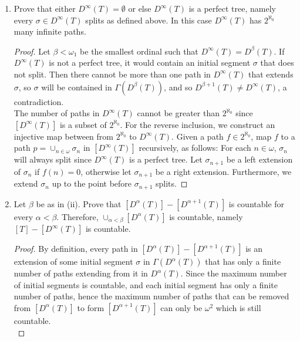 \documentclass{article}
\begin{document}
\begin{enumerate}[label={\bf Q\arabic*:}]
\begin{enumerate}[label={(\roman*)}]
      \item Prove that either $D^\infty(T)=\emptyset$ or else $D^\infty(T)$
        is a perfect tree, namely every $\sigma\in D^\infty(T)$ splits as
        defined above. In this case $D^\infty(T)$ has $2^{\aleph_0}$ many
        infinite paths.

        \begin{proof}
          Let $\beta<\omega_1$ be the smallest ordinal such that
          $D^\infty(T)=D^\beta(T)$. If $D^\infty(T)$ is not a perfect tree,
          it would contain an initial segment $\sigma$ that does not split.
          Then there cannot be more than one path in $D^\infty(T)$ that
          extends $\sigma$, so $\sigma$ will be contained in
          $\Gamma(D^\beta(T))$, and so $D^{\beta+1}(T)\neq
          D^\infty(T)$, a contradiction. \\

          The number of paths in $D^\infty(T)$ cannot be greater than
          $2^{\aleph_0}$ since $[D^\infty(T)]$ is a subset of
          $2^{\aleph_0}$. For the reverse inclusion, we construct an
          injective map between from $2^{\aleph_0}$ to $D^\infty(T)$. Given
          a path $f\in2^{\aleph_0}$, map $f$ to a path
          $p=\cup_{n\in\omega}\sigma_n$ in $[D^\infty(T)]$ recursively, as
          follows: For each $n\in\omega$, $\sigma_n$ will always split
          since $D^\infty(T)$ is a perfect tree. Let $\sigma_{n+1}$ be a
          left extension of $\sigma_{n}$ if $f(n)=0$, otherwise let
          $\sigma_{n+1}$ be a right extension. Furthermore, we extend
          $\sigma_n$ up to the point before $\sigma_{n+1}$ splits.
        \end{proof}

      \item Let $\beta$ be as in (ii). Prove that
        $[D^\alpha(T)]-[D^{\alpha+1}(T)]$ is countable for every
        $\alpha<\beta$. Therefore, $\cup_{\alpha<\beta}[D^\alpha(T)]$ is
        countable, namely $[T]-[D^\infty(T)]$ is countable.

        \begin{proof}
          By definition, every path in $[D^\alpha(T)]-[D^{\alpha+1}(T)]$ is
          an extension of some initial segment $\sigma$ in
          $\Gamma(D^\alpha(T))$ that has only a finite number of paths
          extending from it in $D^\alpha(T)$. Since the maximum number of
          initial segments is countable, and each initial segment has only
          a finite number of paths, hence the maximum number of paths that
          can be removed from $[D^\alpha(T)]$ to form $[D^{\alpha+1}(T)]$
          can only be $\omega^2$ which is still countable. \\


\end{proof}
\end{enumerate}
\end{enumerate}
\end{document}
